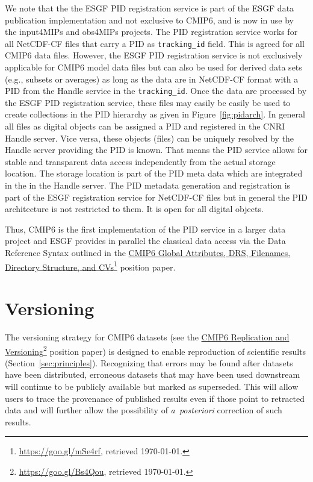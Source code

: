 \documentclass[gmd,manuscript]{copernicus}
\newcommand{\urlref}[2] {\href{#1}{#2}\footnote{\url{#1}, retrieved \today.}}
\begin{document}
We note that the the ESGF PID registration service is part of the ESGF
data publication implementation and not exclusive to CMIP6, and is now
in use by the input4MIPs and obs4MIPs projects. The PID
registration service works for all NetCDF-CF files that carry a PID
as \texttt{tracking\_id} field. This is agreed for all CMIP6 data
files. However, the ESGF PID registration service is not exclusively
applicable for CMIP6 model data files but can also be used for derived data
sets (e.g., subsets or averages) as long as the data are in
NetCDF-CF format with a PID from the Handle service in the
\texttt{tracking\_id}. Once the data are processed by the ESGF PID
registration service, these files may easily be easily be used to
create collections in the PID hierarchy as given in
Figure~\ref{fig:pidarch}. In general all files as digital objects can
be assigned a PID and registered in the CNRI Handle server. Vice
versa, these objects (files) can be uniquely resolved by the Handle
server providing the PID is known. That means the PID service allows
for stable and transparent data access independently from the actual
storage location. The storage location is part of the PID meta data
which are integrated in the in the Handle server. The PID metadata
generation and registration is part of the ESGF registration service
for NetCDF-CF files but in general the PID architecture is not
restricted to them. It is open for all digital objects.

Thus, CMIP6 is the first implementation of the PID service in a larger
data project and ESGF provides in parallel the classical data access
via the Data Reference Syntax outlined in the
\urlref{https://goo.gl/mSe4rf}{CMIP6 Global Attributes, DRS,
  Filenames, Directory Structure, and CVs} position paper.

\section{Versioning}
\label{sec:version}

The versioning strategy for CMIP6 datasets (see the \urlref{https://goo.gl/Bs4Qou}{CMIP6 Replication and Versioning} position paper) is designed to enable
reproduction of scientific results  (Section~\ref{sec:principles}).
Recognizing that errors may be found after datasets
have been distributed, erroneous datasets that may have been used
downstream will continue to be publicly available but marked as
superseded. This will allow users to trace the provenance of published
results even if those point to retracted data and will further allow the
possibility of \emph{a~posteriori} correction of such results.
\end{document}
